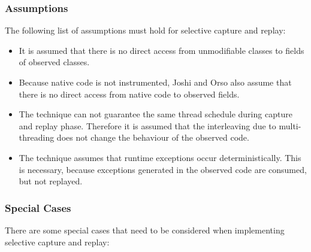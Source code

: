 \subsubsection{Assumptions}
The following list of assumptions must hold for selective capture and replay:
\begin{itemize}
 \item It is assumed that there is no direct access from unmodifiable classes to fields of observed classes.
 \item Because native code is not instrumented, Joshi and Orso also assume that there is no direct access from native code to observed fields.
 \item The technique can not guarantee the same thread schedule during capture and replay phase. Therefore it is assumed that the interleaving due to multi-threading does not change the behaviour of the observed code.
 \item The technique assumes that runtime exceptions occur deterministically. This is necessary, because exceptions generated in the observed code are consumed, but not replayed.
\end{itemize}

\subsubsection{Special Cases}
There are some special cases that need to be considered when implementing selective capture and replay:

